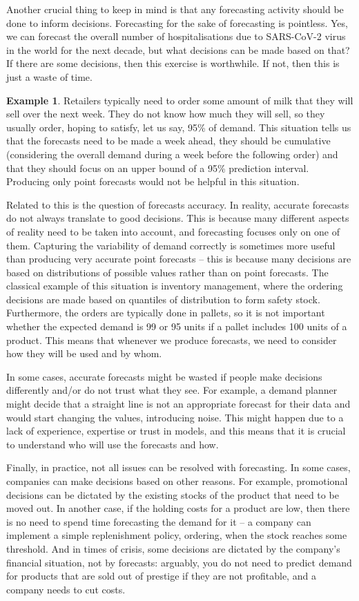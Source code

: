 \documentclass[
]{book}
\theoremstyle{definition}
\theoremstyle{definition}
\newtheorem{example}{Example}[chapter]
\theoremstyle{definition}
\theoremstyle{definition}
\theoremstyle{remark}
\begin{document}
Another crucial thing to keep in mind is that any forecasting activity should be done to inform decisions. Forecasting for the sake of forecasting is pointless. Yes, we can forecast the overall number of hospitalisations due to SARS-CoV-2 virus in the world for the next decade, but what decisions can be made based on that? If there are some decisions, then this exercise is worthwhile. If not, then this is just a waste of time.

\begin{example}
Retailers typically need to order some amount of milk that they will sell over the next week. They do not know how much they will sell, so they usually order, hoping to satisfy, let us say, 95\% of demand. This situation tells us that the forecasts need to be made a week ahead, they should be cumulative (considering the overall demand during a week before the following order) and that they should focus on an upper bound of a 95\% prediction interval. Producing only point forecasts would not be helpful in this situation.
\end{example}

Related to this is the question of forecasts accuracy. In reality, accurate forecasts do not always translate to good decisions. This is because many different aspects of reality need to be taken into account, and forecasting focuses only on one of them. Capturing the variability of demand correctly is sometimes more useful than producing very accurate point forecasts -- this is because many decisions are based on distributions of possible values rather than on point forecasts. The classical example of this situation is inventory management, where the ordering decisions are made based on quantiles of distribution to form safety stock. Furthermore, the orders are typically done in pallets, so it is not important whether the expected demand is 99 or 95 units if a pallet includes 100 units of a product. This means that whenever we produce forecasts, we need to consider how they will be used and by whom.

In some cases, accurate forecasts might be wasted if people make decisions differently and/or do not trust what they see. For example, a demand planner might decide that a straight line is not an appropriate forecast for their data and would start changing the values, introducing noise. This might happen due to a lack of experience, expertise or trust in models, and this means that it is crucial to understand who will use the forecasts and how.

Finally, in practice, not all issues can be resolved with forecasting. In some cases, companies can make decisions based on other reasons. For example, promotional decisions can be dictated by the existing stocks of the product that need to be moved out. In another case, if the holding costs for a product are low, then there is no need to spend time forecasting the demand for it -- a company can implement a simple replenishment policy, ordering, when the stock reaches some threshold. And in times of crisis, some decisions are dictated by the company's financial situation, not by forecasts: arguably, you do not need to predict demand for products that are sold out of prestige if they are not profitable, and a company needs to cut costs.
\end{document}

